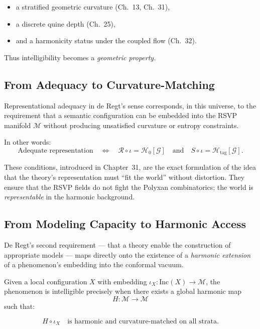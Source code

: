 \begin{itemize}
\item a stratified geometric curvature (Ch.~13, Ch.~31),
\item a discrete quine depth (Ch.~25),
\item and a harmonicity status under the coupled flow (Ch.~32).
\end{itemize}

Thus intelligibility becomes a \emph{geometric property.}

\bigskip

\subsection*{From Adequacy to Curvature-Matching}

Representational adequacy in de Regt’s sense corresponds, in this universe,
to the requirement that a semantic configuration can be embedded into the
RSVP manifold $\mathcal{M}$ without producing unsatisfied curvature or
entropy constraints.

In other words:
\[
\text{Adequate representation}
\quad\Longleftrightarrow\quad
\mathcal{R} \circ \iota = \mathcal{H}_0[\mathcal{G}]
\quad\text{and}\quad
S \circ \iota = \mathcal{H}_{\mathrm{tag}}[\mathcal{G}].
\]

These conditions, introduced in Chapter~31, are the exact formulation of the
idea that the theory’s representation must “fit the world” without distortion.
They ensure that the RSVP fields do not fight the Polyxan combinatorics; the
world is \emph{representable} in the harmonic background.

\bigskip

\subsection*{From Modeling Capacity to Harmonic Access}

De Regt’s second requirement — that a theory enable the construction of
appropriate models — maps directly onto the existence of a \emph{harmonic
extension} of a phenomenon’s embedding into the conformal vacuum.

Given a local configuration $X$ with embedding
$\iota_X : \mathrm{Inc}(X) \to \mathcal{M}$,
the phenomenon is intelligible precisely when there exists a global
harmonic map
\[
H : \mathcal{M} \to \mathcal{M}
\]
such that:

\[
H \circ \iota_X \quad \text{is harmonic and curvature-matched on all strata.}
\]

